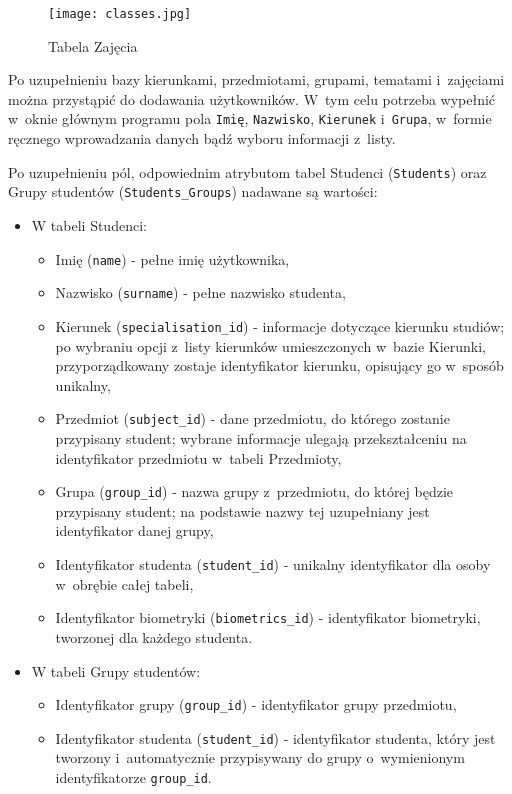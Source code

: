 \begin{figure}
\begin{center}
\texttt{[image: classes.jpg]}
\caption{Tabela Zajęcia}
\label{fig:classes}
\end{center}
\end{figure}

Po uzupełnieniu bazy kierunkami, przedmiotami, grupami, tematami i~zajęciami można przystąpić do dodawania użytkowników. W~tym celu potrzeba wypełnić w~oknie głównym programu pola \verb!Imię!, \verb!Nazwisko!, \verb!Kierunek! i~\verb!Grupa!, w~formie ręcznego wprowadzania danych bądź wyboru informacji z~listy.

Po uzupełnieniu pól, odpowiednim atrybutom tabel Studenci (\verb!Students!) oraz Grupy studentów (\verb!Students_Groups!) nadawane są wartości:
\begin{itemize}
\item W tabeli Studenci:
\begin{itemize}
\item Imię (\verb!name!) - pełne imię użytkownika,
\item Nazwisko (\verb!surname!) - pełne nazwisko studenta,
\item Kierunek (\verb!specialisation_id!) - informacje dotyczące kierunku studiów; po wybraniu opcji z~listy kierunków umieszczonych w~bazie Kierunki, przyporządkowany zostaje identyfikator kierunku, opisujący go w~sposób unikalny,
\item Przedmiot (\verb!subject_id!) - dane przedmiotu, do którego zostanie przypisany student; wybrane informacje ulegają przekształceniu na identyfikator przedmiotu w~tabeli Przedmioty,
\item Grupa (\verb!group_id!) - nazwa grupy z~przedmiotu, do której będzie przypisany student; na podstawie nazwy tej uzupełniany jest identyfikator danej grupy,
\item Identyfikator studenta (\verb!student_id!) - unikalny identyfikator dla osoby w~obrębie całej tabeli,
\item Identyfikator biometryki (\verb!biometrics_id!) - identyfikator biometryki, tworzonej dla każdego studenta.
\end{itemize}
\item W tabeli Grupy studentów:
\begin{itemize}
\item Identyfikator grupy (\verb!group_id!) - identyfikator grupy przedmiotu,
\item Identyfikator studenta (\verb!student_id!) - identyfikator studenta, który jest tworzony i~automatycznie przypisywany do grupy o~wymienionym identyfikatorze \verb!group_id!.
\end{itemize}
\end{itemize}

